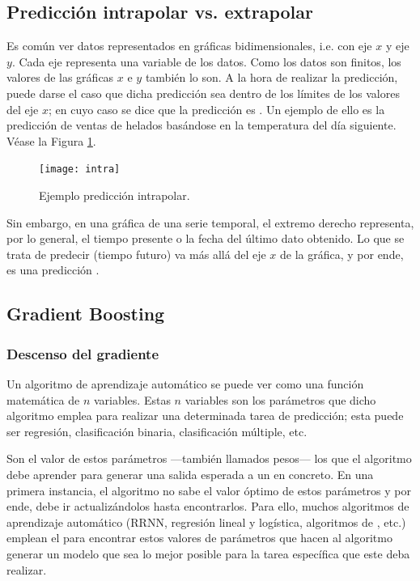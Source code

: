 \subsection{Predicción intrapolar vs. extrapolar}
\label{ap:intravsextra}
Es común ver datos representados en gráficas bidimensionales, i.e. con eje $x$ y eje $y$. Cada eje representa una variable de los datos. Como los datos son finitos, los valores de las gráficas $x$ e $y$ también lo son. A la hora de realizar la predicción, puede darse el caso que dicha predicción sea dentro de los límites de los valores del eje $x$; en cuyo caso se dice que la predicción es . Un ejemplo de ello es la predicción de ventas de helados basándose en la temperatura del día siguiente. Véase la Figura \ref{intra}.
\begin{figure}[H]
    \centering
    \texttt{[image: intra]}
    \caption{Ejemplo predicción intrapolar.}
    \label{intra}
\end{figure}

Sin embargo, en una gráfica de una serie temporal, el extremo derecho representa, por lo general, el tiempo presente o la fecha del último dato obtenido. Lo que se trata de predecir (tiempo futuro) va más allá del eje $x$ de la gráfica, y por ende, es una predicción .


\subsection{Gradient Boosting}
\subsubsection{Descenso del gradiente}
\label{ap:desc_grad}

Un algoritmo de aprendizaje automático se puede ver como una función matemática de $n$ variables. Estas $n$ variables son los parámetros que dicho algoritmo emplea para realizar una determinada tarea de predicción; esta puede ser regresión, clasificación binaria, clasificación múltiple, etc. 

Son el valor de estos parámetros ---también llamados pesos--- los que el algoritmo debe aprender para generar una salida esperada a un  en concreto. En una primera instancia, el algoritmo no sabe el valor óptimo de estos parámetros y por ende, debe ir actualizándolos hasta  encontrarlos. Para ello, muchos algoritmos de aprendizaje automático (RRNN, regresión lineal y logística, algoritmos de , etc.) emplean el  para encontrar estos valores de parámetros que hacen al algoritmo generar un modelo que sea lo mejor posible para la tarea específica que este deba realizar.

